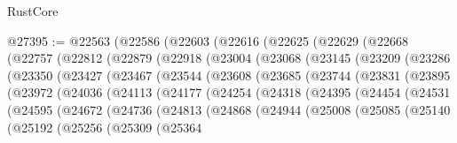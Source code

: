 \begin{lexlean}{RustCore}
\begin{coremodule}
@27395 := @22563
    (@22586
      (@22603
        (@22616
          (@22625
            (@22629
              (@22668
                (@22757
                  (@22812
                    (@22879
                      (@22918
                        (@23004
                          (@23068
                            (@23145
                              (@23209
                                (@23286
                                  (@23350
                                    (@23427
                                      (@23467
                                        (@23544
                                          (@23608
                                            (@23685
                                              (@23744
                                                (@23831
                                                  (@23895
                                                    (@23972
                                                      (@24036
                                                        (@24113
                                                          (@24177
                                                            (@24254
                                                              (@24318
                                                                (@24395
                                                                  (@24454
                                                                    (@24531
                                                                      (@24595
                                                                        (@24672
                                                                          (@24736
                                                                            (@24813
                                                                              (@24868
                                                                                (@24944
                                                                                  (@25008
                                                                                    (@25085
                                                                                      (@25140
                                                                                        (@25192
                                                                                          (@25256
                                                                                            (@25309
                                                                                              (@25364

\end{coremodule}
\end{lexlean}
